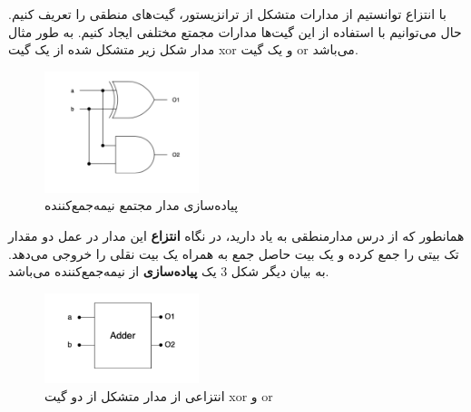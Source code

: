 \begin{flushright}
    با انتزاع توانستیم از مدارات متشکل از ترانزیستور، گیت‌های منطقی را تعریف کنیم.
    حال می‌توانیم با استفاده از این گیت‌ها مدارات مجمتع مختلفی ایجاد کنیم.
    به طور مثال مدار شکل زیر متشکل شده از یک گیت xor و یک گیت or می‌باشد.

    \begin{figure}[h]
        \centering
        \includegraphics[width= 0.4\textwidth]{source/half-adder-imp}
        \caption{پیاده‌سازی مدار مجتمع نیمه‌جمع‌کننده}
        \label{fig:half-adder-imp}
    \end{figure}

    همانطور که از درس مدارمنطقی به یاد دارید، در نگاه \textbf{انتزاع} این مدار در عمل دو مقدار تک بیتی را جمع کرده و یک بیت حاصل جمع به همراه یک بیت نقلی را خروجی می‌دهد.
    به بیان دیگر شکل 3 یک \textbf{پیاده‌سازی} از نیمه‌جمع‌کننده می‌باشد.

    \begin{figure}[h]
        \centering
        \includegraphics[width= 0.4\textwidth]{source/half-adder-abs}
        \caption{انتزاعی از مدار متشکل از دو گیت xor و or}
        \label{fig:half-adder-abs}
    \end{figure}

\end{flushright}